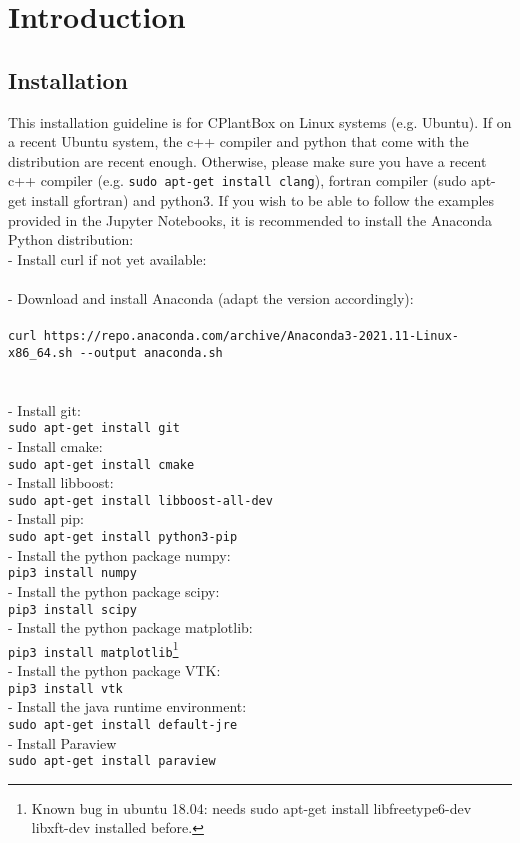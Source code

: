 \newpage
\section{Introduction}
\subsection{Installation}

This installation guideline is for CPlantBox on Linux systems (e.g. Ubuntu). 
If on a recent Ubuntu system, the c++ compiler and python that come with the distribution are recent enough. Otherwise, please make sure you have a recent c++ compiler (e.g. \lstinline{sudo apt-get install clang}), fortran compiler (sudo apt-get install gfortran) and python3. If you wish to be able to follow the examples provided in the Jupyter Notebooks, it is recommended to install the Anaconda Python distribution: \\
- Install curl if not yet available:\\
\\
- Download and install Anaconda (adapt the version accordingly):\\
\\
\lstinline{curl https://repo.anaconda.com/archive/Anaconda3-2021.11-Linux-x86_64.sh --output anaconda.sh} \\
\\
\\

- Install git: \\
\lstinline{sudo apt-get install git}\\
- Install cmake:\\
\lstinline{sudo apt-get install cmake}\\
- Install libboost:\\
\lstinline{sudo apt-get install libboost-all-dev}\\
- Install pip:\\
\lstinline{sudo apt-get install python3-pip}\\
- Install the python package numpy:\\
\lstinline{pip3 install numpy}\\
- Install the python package scipy:\\
\lstinline{pip3 install scipy}\\
- Install the python package matplotlib:\\
\lstinline{pip3 install matplotlib}\footnote{Known bug in ubuntu 18.04: needs sudo apt-get install libfreetype6-dev libxft-dev installed before.}\\
- Install the python package VTK:\\
\lstinline {pip3 install vtk}\\
- Install the java runtime environment:\\
\lstinline{sudo apt-get install default-jre}\\
- Install Paraview\\
\lstinline{sudo apt-get install paraview}\\

